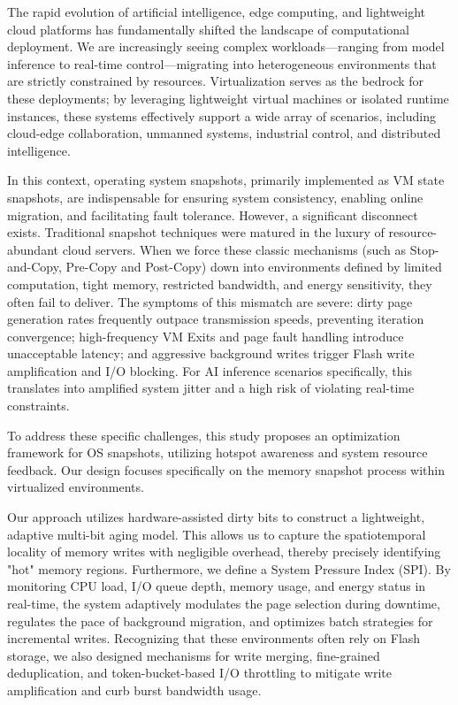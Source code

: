 

\begin{eabstract}

The rapid evolution of artificial intelligence, edge computing, and lightweight cloud platforms has fundamentally shifted the landscape of computational deployment. We are increasingly seeing complex workloads—ranging from model inference to real-time control—migrating into heterogeneous environments that are strictly constrained by resources. Virtualization serves as the bedrock for these deployments; by leveraging lightweight virtual machines or isolated runtime instances, these systems effectively support a wide array of scenarios, including cloud-edge collaboration, unmanned systems, industrial control, and distributed intelligence.

In this context, operating system snapshots, primarily implemented as VM state snapshots, are indispensable for ensuring system consistency, enabling online migration, and facilitating fault tolerance. However, a significant disconnect exists. Traditional snapshot techniques were matured in the luxury of resource-abundant cloud servers. When we force these classic mechanisms (such as Stop-and-Copy, Pre-Copy and Post-Copy) down into environments defined by limited computation, tight memory, restricted bandwidth, and energy sensitivity, they often fail to deliver. The symptoms of this mismatch are severe: dirty page generation rates frequently outpace transmission speeds, preventing iteration convergence; high-frequency VM Exits and page fault handling introduce unacceptable latency; and aggressive background writes trigger Flash write amplification and I/O blocking. For AI inference scenarios specifically, this translates into amplified system jitter and a high risk of violating real-time constraints.

To address these specific challenges, this study proposes an optimization framework for OS snapshots, utilizing hotspot awareness and system resource feedback. Our design focuses specifically on the memory snapshot process within virtualized environments.

Our approach utilizes hardware-assisted dirty bits to construct a lightweight, adaptive multi-bit aging model. This allows us to capture the spatiotemporal locality of memory writes with negligible overhead, thereby precisely identifying "hot" memory regions. Furthermore, we define a System Pressure Index (SPI). By monitoring CPU load, I/O queue depth, memory usage, and energy status in real-time, the system adaptively modulates the page selection during downtime, regulates the pace of background migration, and optimizes batch strategies for incremental writes. Recognizing that these environments often rely on Flash storage, we also designed mechanisms for write merging, fine-grained deduplication, and token-bucket-based I/O throttling to mitigate write amplification and curb burst bandwidth usage.


\end{eabstract}
